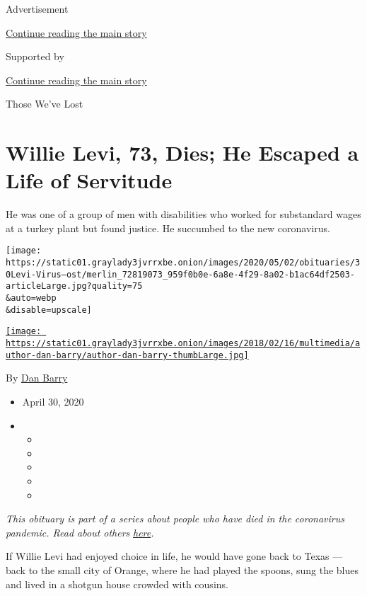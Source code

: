 Advertisement

\protect\hyperlink{after-top}{Continue reading the main story}

Supported by

\protect\hyperlink{after-sponsor}{Continue reading the main story}

Those We've Lost

\hypertarget{willie-levi-73-dies-he-escaped-a-life-of-servitude}{%
\section{Willie Levi, 73, Dies; He Escaped a Life of
Servitude}\label{willie-levi-73-dies-he-escaped-a-life-of-servitude}}

He was one of a group of men with disabilities who worked for
substandard wages at a turkey plant but found justice. He succumbed to
the new coronavirus.

\texttt{[image: https://static01.graylady3jvrrxbe.onion/images/2020/05/02/obituaries/30Levi-Virus--ost/merlin\_72819073\_959f0b0e-6a8e-4f29-8a02-b1ac64df2503-articleLarge.jpg?quality=75\\\&auto=webp\\\&disable=upscale]}

\href{https://www.nytimes3xbfgragh.onion/by/dan-barry}{\texttt{[image: https://static01.graylady3jvrrxbe.onion/images/2018/02/16/multimedia/author-dan-barry/author-dan-barry-thumbLarge.jpg]}}

By \href{https://www.nytimes3xbfgragh.onion/by/dan-barry}{Dan Barry}

\begin{itemize}
\item
  April 30, 2020
\item
  \begin{itemize}
  \item
  \item
  \item
  \item
  \item
  \end{itemize}
\end{itemize}

\emph{This obituary is part of a series about people who have died in
the coronavirus pandemic. Read about others}
\href{https://www.nytimes3xbfgragh.onion/series/people-who-have-died-of-the-coronavirus}{\emph{here}}\emph{.}

If Willie Levi had enjoyed choice in life, he would have gone back to
Texas --- back to the small city of Orange, where he had played the
spoons, sung the blues and lived in a shotgun house crowded with
cousins.


